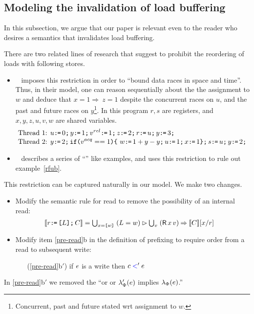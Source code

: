 \subsection{Modeling the invalidation of load buffering}

In this subsection, we argue that our paper is relevant even to the reader who desires a semantics that invalidates load buffering.  

There are two related lines of research that suggest to prohibit the reordering of loads with following stores.  
\begin{itemize}
\item 
~\citet{Dolan:2018:BDR:3192366.3192421} imposes this restriction in order to ``bound data races in space and time''.  Thus, in their model, one can reason sequentially about the the assignment to $w$ and deduce that $x=1 \Rightarrow\ z= 1$ despite the concurrent races on $u$, and  the past and future races on $y$\footnote{Concurrent, past and future stated wrt assignment to $w$.}.   In this program $r,s$ are registers, and $x,y,z,u,v,w$ are shared variables.
\begin{align*}
\mbox{Thread 1: } & u \texttt{:}\mkern-1mu\texttt{=}\, 0 \texttt{;}\, y \texttt{:}\mkern-1mu\texttt{=}\, 1 \texttt{;}\, v^{rel}  \texttt{:}\mkern-1mu\texttt{=}\, 1 \texttt{;}\, z \texttt{:}\mkern-1mu\texttt{=}\, 2 \texttt{;}\, r \texttt{:}\mkern-1mu\texttt{=}\, u \texttt{;}\, y \texttt{:}\mkern-1mu\texttt{=}\, 3 \texttt{;}\, \\[-.5ex]
\mbox{Thread 2: } & y \texttt{:}\mkern-1mu\texttt{=}\, 2 \texttt{;}\,  \texttt{if}\allowbreak\texttt{(}v^{acq}==1\texttt{)} \allowbreak\texttt{\{}\ w \texttt{:}\mkern-1mu\texttt{=}\, 1 + y -y \texttt{;}\, u \texttt{:}\mkern-1mu\texttt{=}\, 1 \texttt{;}\, x \texttt{:}\mkern-1mu\texttt{=}\, 1  \texttt{\}} \texttt{;}\, s \texttt{:}\mkern-1mu\texttt{=}\, u \texttt{;}\,  y \texttt{:}\mkern-1mu\texttt{=}\, 2 \texttt{;}\,
\end{align*}
\item ~\citet{BoehmOOTA} describes a series of ``\oota'' like examples, and uses this restriction to rule out example~\ref{rfub}.  
\end{itemize}

This restriction can be captured naturally in our model.  We make two changes.
\begin{itemize}
\item Modify the semantic rule for read to remove the possibility of an internal read:
  \begin{align*}
    \sem{\aReg\GETS\REF{\cExp}\SEMI \aCmd} & =
    \textstyle\bigcup_{\aLoc=\REF{\bVal}}\; ({\cExp}=\bVal) \guard \textstyle\bigcup_\aVal\; (\DR\aLoc\aVal) \prefix \sem{\aCmd}[\aLoc/\aReg] 
  \end{align*}
\item Modify item \ref{pre-read}b in the definition of prefixing to require
  order from a read to subsequent write:
  \begin{enumerate}
  \item[(\ref{pre-read}b$'$)] if $e$ is a write then  $c\mathrel{{\color{blue}<}}'e$ 
  \end{enumerate}
\end{itemize}
In \ref{pre-read}b$'$ we removed the ``or or $\lambda_{\Phi}'(e)$ implies
$\lambda_{\Phi}(e)$.''

